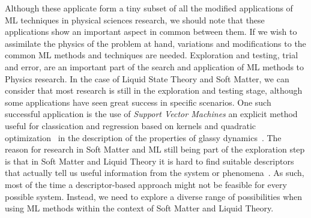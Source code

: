 Although these applicate form a tiny subset of all the modified applications of ML 
techniques in physical sciences research, we should note that these applications show an 
important aspect in common between them. If we wish to assimilate the physics of the 
problem at hand, variations and modifications to the common ML methods and techniques are 
needed. Exploration and testing, trial and error, are an important part of the search and 
application of ML methods to Physics research. In the case of Liquid State Theory and Soft 
Matter, we can consider that most research is still in the exploration and testing stage,
although some applications have seen great success in specific scenarios.
One such successful application is the use of \emph{Support Vector Machines}\textemdash
an explicit method useful for classication and regression based on kernels and
quadratic optimization~\cite{steinwartSupportVectorMachines2008}\textemdash
in the description of the properties of glassy dynamics~\cite{schoenholzStructuralApproachRelaxation2016}.
The reason for research in Soft Matter and ML still being part of the exploration step is 
that in Soft Matter and Liquid Theory it is hard to find suitable descriptors that 
actually tell us useful information from the system or phenomena~\cite{dijkstraPredictiveModellingMachine2021a}.
As such, most of the time a descriptor-based approach might not be feasible for every 
possible system. Instead, we need to explore a diverse range of possibilities when using ML 
methods within the context of Soft Matter and Liquid Theory.


